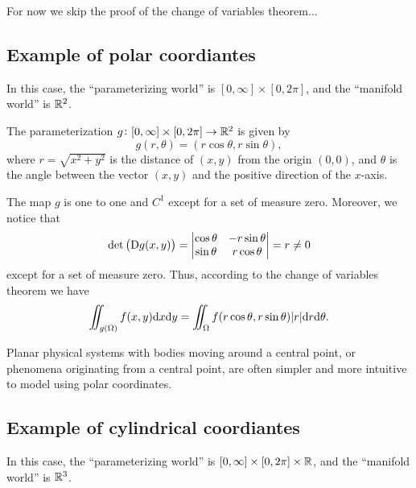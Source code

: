 \documentclass[11pt,a4paper]{article}
\begin{document}
For now we skip the proof of the change of variables theorem...

\subsection{Example of polar coordiantes}
In this case, the ``parameterizing world'' is $[0,\infty] \times [0,2\pi]$,
and the ``manifold world'' is $\mathbb{R}^2$.

\begin{example}
  The parameterization $g \colon [0,\infty] \times [0,2\pi] \to \mathbb{R}^2$
  is given by
  \[
    g(r,\theta) = (r \cos \theta,r \sin \theta),
  \]
  where $r = \sqrt{x^2 + y^2}$ is the distance of $(x,y)$ from the
  origin $(0,0)$, and $\theta$ is the angle between the vector $(x,y)$
  and the positive direction of the $x$-axis.

  The map $g$ is one to one and $C^1$ except for a set of measure zero.
  Moreover, we notice that
  \[
    \det\del{\Dif g(x,y)} =
    \begin{vmatrix}
      \cos\theta & -r\sin\theta \\
      \sin\theta & r\cos\theta
    \end{vmatrix} = r \neq 0
  \]
  except for a set of measure zero.
  Thus, according to the change of variables theorem we have
  \[
    \iint_{g(\Omega)} f(x,y) \dx \dy =
    \iint_{\Omega} f(r \cos \theta, r \sin \theta) |r| \dr \dtheta.
  \]
\end{example}

\begin{remark}
  Planar physical systems with bodies moving around a central point,
  or phenomena originating from a central point,
  are often simpler and more intuitive to model using polar coordinates.
\end{remark}

\subsection{Example of cylindrical coordiantes}
In this case, the ``parameterizing world''
is $[0,\infty] \times [0,2\pi] \times \mathbb{R}$,
and the ``manifold world'' is $\mathbb{R}^3$.
\end{document}
